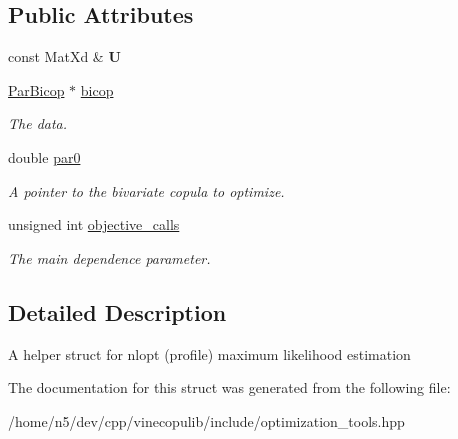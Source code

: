 \subsection*{Public Attributes}
\begin{DoxyCompactItemize}
\item 
const Mat\+Xd \& {\bfseries U}\hypertarget{structoptimization__tools_1_1_par_bicop_opt_data_aac227c20bf1319f39d830d2b1813648d}{}\label{structoptimization__tools_1_1_par_bicop_opt_data_aac227c20bf1319f39d830d2b1813648d}

\item 
\hyperlink{class_par_bicop}{Par\+Bicop} $\ast$ \hyperlink{structoptimization__tools_1_1_par_bicop_opt_data_a9ab9163a5fa571ff992505711ee0d6e9}{bicop}\hypertarget{structoptimization__tools_1_1_par_bicop_opt_data_a9ab9163a5fa571ff992505711ee0d6e9}{}\label{structoptimization__tools_1_1_par_bicop_opt_data_a9ab9163a5fa571ff992505711ee0d6e9}

\begin{DoxyCompactList}\small\item\em The data. \end{DoxyCompactList}\item 
double \hyperlink{structoptimization__tools_1_1_par_bicop_opt_data_ae975b618fc0f6b1c5c17b430b3fdc582}{par0}\hypertarget{structoptimization__tools_1_1_par_bicop_opt_data_ae975b618fc0f6b1c5c17b430b3fdc582}{}\label{structoptimization__tools_1_1_par_bicop_opt_data_ae975b618fc0f6b1c5c17b430b3fdc582}

\begin{DoxyCompactList}\small\item\em A pointer to the bivariate copula to optimize. \end{DoxyCompactList}\item 
unsigned int \hyperlink{structoptimization__tools_1_1_par_bicop_opt_data_a30ba76cb34de8ceb44731469a39bc8bb}{objective\+\_\+calls}\hypertarget{structoptimization__tools_1_1_par_bicop_opt_data_a30ba76cb34de8ceb44731469a39bc8bb}{}\label{structoptimization__tools_1_1_par_bicop_opt_data_a30ba76cb34de8ceb44731469a39bc8bb}

\begin{DoxyCompactList}\small\item\em The main dependence parameter. \end{DoxyCompactList}\end{DoxyCompactItemize}


\subsection{Detailed Description}
A helper struct for nlopt (profile) maximum likelihood estimation 

The documentation for this struct was generated from the following file\+:\begin{DoxyCompactItemize}
\item 
/home/n5/dev/cpp/vinecopulib/include/optimization\+\_\+tools.\+hpp\end{DoxyCompactItemize}
